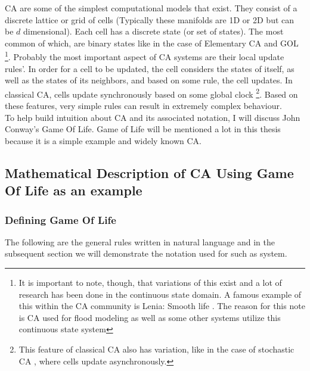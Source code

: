 CA are some of the simplest computational models that exist. They consist of a discrete lattice or grid of cells (Typically these manifolds are 1D or 2D but can be $d$ dimensional). Each cell has a discrete state (or set of states). The most common of which, are binary states like in the case of Elementary CA and GOL \footnote{It is important to note, though, that variations of this exist and a lot of research has been done in the continuous state domain. A famous example of this within the CA community is Lenia: Smooth life \cite{chan2018lenia}. The reason for this note is CA used for flood modeling as well as some other systems utilize this continuous state system}. Probably the most important aspect of CA systems are their local update rules'. In order for a cell to be updated, the cell considers the states of itself, as well as the states of its neighbors, and based on some rule, the cell updates. In classical CA, cells update synchronously based on some global clock \footnote{This feature of classical CA also has variation, like in the case of stochastic CA \cite{fates2013stochastic}, where cells update asynchronously.}. Based on these features, very simple rules can result in extremely complex behaviour. \\
To help build intuition about CA and its associated notation, I will discuss John Conway's Game Of Life. Game of Life will be mentioned a lot in this thesis because it is a simple example and widely known CA.

\subsection{Mathematical Description of CA Using Game Of Life as an example}

\subsubsection*{Defining Game Of Life}
The following are the general rules written in natural language and in the subsequent section we will demonstrate the notation used for such as system.

